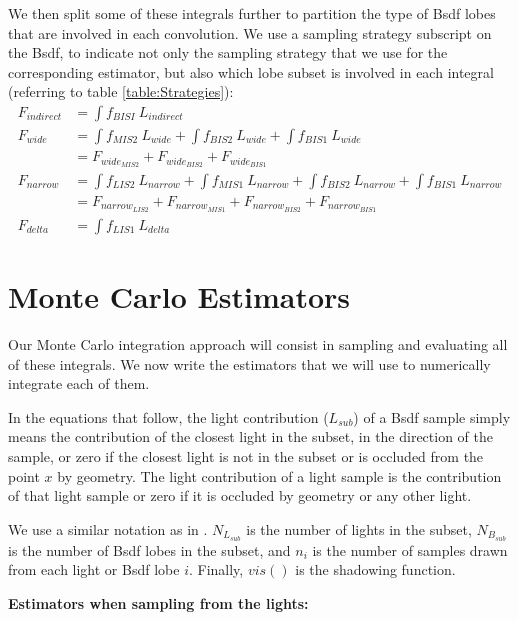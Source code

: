 \documentclass{article}
\begin{document}
We then split some of these integrals further to partition the type
of Bsdf lobes that are involved in each convolution. We use a
sampling strategy subscript on the Bsdf, to indicate not only the
sampling strategy that we use for the corresponding estimator, but
also  which lobe subset is involved in each integral (referring to table
\ref{table:Strategies}):
\begin{align*}
F_{indirect}  &=  \int f_{BISI}  \  L_{indirect}  \\
F_{wide}      &=  \int f_{MIS2}  \  L_{wide}  +  \int f_{BIS2}  \  L_{wide}  +  \int f_{BIS1}  \  L_{wide}  \\
              &=  F_{wide_{MIS2}}  +  F_{wide_{BIS2}}  +  F_{wide_{BIS1}}  \\
F_{narrow}    &=  \int f_{LIS2}  \  L_{narrow}  +  \int f_{MIS1}  \  L_{narrow}  +  \int f_{BIS2}  \  L_{narrow}  +  \int f_{BIS1}  \  L_{narrow}  \\
              &=  F_{narrow_{LIS2}}  +  F_{narrow_{MIS1}}  +  F_{narrow_{BIS2}}  +  F_{narrow_{BIS1}}  \\
F_{delta}     &=  \int f_{LIS1}  \  L_{delta}
\end{align*}



\section{Monte Carlo Estimators}\label{Estimators}

Our Monte Carlo integration approach will consist in sampling and
evaluating all of these integrals. We now write the estimators that
we will use to numerically integrate each of them.

In the equations that follow, the light contribution ($L_{sub}$) of
a Bsdf sample simply means the contribution of the closest light in
the subset, in the direction of the sample, or zero if the closest
light is not in the subset or is occluded from the point $x$ by
geometry. The light contribution of a light sample is the
contribution of that light sample or zero if it is occluded by
geometry or any other light.

We use a similar notation as in \cite{Veach:95}. $N_{L_{sub}}$ is
the number of lights in the subset, $N_{B_{sub}}$ is the number of
Bsdf lobes in the subset, and ${n_i}$ is the number of samples drawn
from each light or Bsdf lobe $i$. Finally, $vis()$ is the shadowing
function.


\vspace{.5cm}
\textbf{Estimators when sampling from the lights:}
\end{document}

